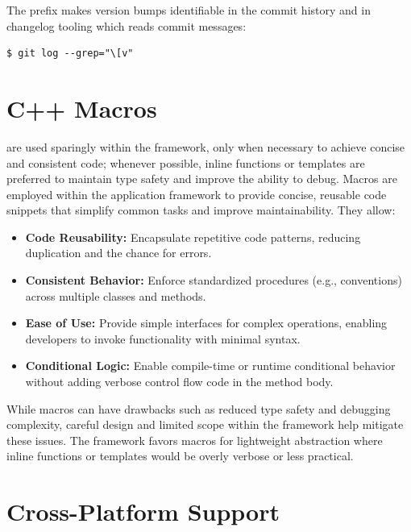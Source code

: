 The prefix makes version bumps identifiable in the commit history and in changelog tooling which reads commit messages:
\begin{lstlisting}[style=terminalstyle]
$ git log --grep="\[v"
\end{lstlisting}








\section{C++ Macros}\label{section:cpp_macros}


 are used sparingly within the framework, only when necessary to achieve concise and consistent code; whenever possible, inline functions or templates are preferred to maintain type safety and improve the ability to debug. Macros are employed within the application framework to provide concise, reusable code snippets that simplify common tasks and improve maintainability. They allow:
\begin{itemize}\itemsep0em
    \item \textbf{Code Reusability:} Encapsulate repetitive code patterns, reducing duplication and the chance for errors.
    \item \textbf{Consistent Behavior:} Enforce standardized procedures (e.g.,  conventions) across multiple classes and methods.
    \item \textbf{Ease of Use:} Provide simple interfaces for complex operations, enabling developers to invoke functionality with minimal syntax.
    \item \textbf{Conditional Logic:} Enable compile-time or runtime conditional behavior without adding verbose control flow code in the method body.
\end{itemize}
While macros can have drawbacks such as reduced type safety and debugging complexity, careful design and limited scope within the framework help mitigate these issues. The framework favors macros for lightweight abstraction where inline functions or templates would be overly verbose or less practical.
















\section{Cross-Platform Support}

